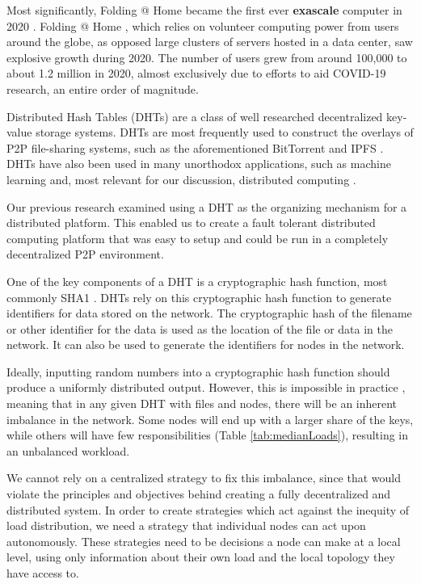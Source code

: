 \documentclass[10pt,conference]{IEEEtran}
\begin{document}
Most significantly, Folding @ Home became the first ever \textbf{exascale} computer in 2020 \cite{folding2020Review} \cite{Zimmerman2020.06.27.175430}.
Folding @ Home \cite{larson2002folding}, which relies on volunteer computing power from users around the globe, as opposed large clusters of servers hosted in a data center, saw explosive growth during 2020.
The number of users grew from around 100,000 to about 1.2 million in 2020, almost exclusively due to efforts to aid COVID-19 research, an entire order of magnitude.



Distributed Hash Tables (DHTs) are a class of well researched decentralized key-value storage systems.
DHTs are most frequently used to construct the overlays of P2P file-sharing systems, such as the aforementioned BitTorrent \cite{bittorrent} and IPFS \cite{benet2014ipfs}.
DHTs have also been used in many unorthodox applications, such as machine learning \cite{liparameter} and, most relevant for our discussion, distributed computing  \cite{marozzo2012p2p} \cite{leemap}.


Our previous research \cite{chordreduce} examined using a DHT as the organizing mechanism for a distributed platform.
This enabled us to create a fault tolerant distributed computing platform that was easy to setup and could be run in a completely decentralized P2P environment.

One of the key components of a DHT is a cryptographic hash function, most commonly SHA1 \cite{sha1}.
DHTs rely on this cryptographic hash function to generate identifiers for data stored on the network.
The cryptographic hash of the filename or other identifier for the data is used as the location of the file or data in the network.
It can also be used to generate the identifiers for nodes in the network.

Ideally, inputting random numbers into a cryptographic hash function should produce a uniformly distributed output.
However, this is impossible in practice \cite{hash-outputs} \cite{thomsen2005cryptographic}, meaning that in any given DHT with files and nodes, there will be an inherent imbalance in the network.
Some nodes will end up with a larger share of the keys, while others will have few responsibilities (Table \ref{tab:medianLoads}), resulting in an unbalanced workload.

We cannot rely on a centralized strategy to fix this imbalance, since that would violate the principles and objectives behind creating a fully decentralized and distributed system.
In order to create strategies which act against the inequity of load distribution, we need a strategy that individual nodes can act upon autonomously.
These strategies need to be decisions a node can make at a local level, using only information about their own load and the local topology they have access to.
\end{document}

